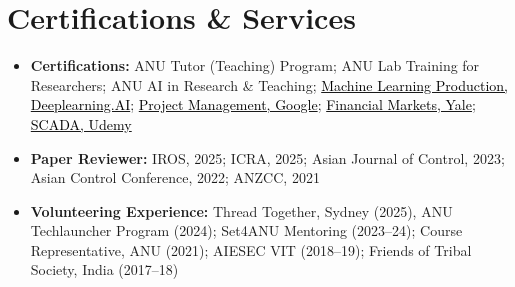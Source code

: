 \documentclass[10pt, a4paper, sans]{moderncv}
\begin{document}
\section*{Certifications \& Services}
\begin{itemize}[leftmargin=*, itemsep=0em]
    \item \textbf{Certifications:} ANU Tutor (Teaching) Program; ANU Lab Training for Researchers; ANU AI in Research \& Teaching; \href{https://coursera.org/share/8204c8b2ca3d84b7fccec7d44edaa8b7}{\textcolor{black}{Machine Learning Production, Deeplearning.AI}}; \href{https://www.coursera.org/account/accomplishments/certificate/JZCYF4MAB3CX}{\textcolor{black}{Project Management, Google}};
    \href{https://www.coursera.org/account/accomplishments/verify/X6R6DZN8VGXN?utm_source=link&utm_medium=certificate&utm_content=cert_image&utm_campaign=pdf_header_button&utm_product=course}{\textcolor{black}{Financial Markets, Yale}};
    \href{https://www.udemy.com/certificate/UC-36c9fc3c-e20c-45fb-994e-776393cdb4ce/}{\textcolor{black}{SCADA, Udemy}}
    \item \textbf{Paper Reviewer:} IROS, 2025; ICRA, 2025; Asian Journal of Control, 2023; Asian Control Conference, 2022; ANZCC, 2021
    \item \textbf{Volunteering Experience:} Thread Together, Sydney (2025), ANU Techlauncher Program (2024); Set4ANU Mentoring (2023--24); Course Representative, ANU (2021); AIESEC VIT (2018--19); Friends of Tribal Society, India (2017--18)
\end{itemize}
\end{document}
